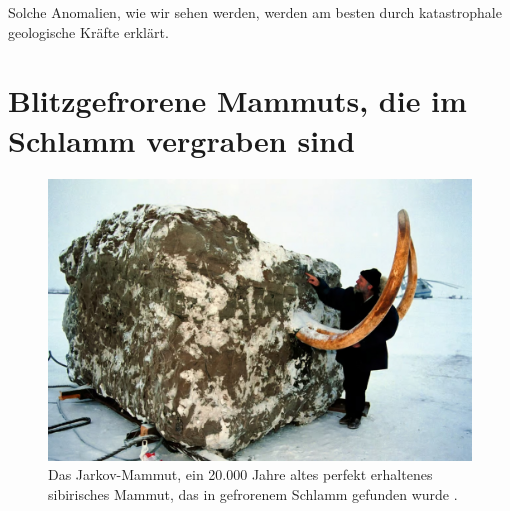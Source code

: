 \documentclass[10pt,twocolumn,letterpaper]{article}
\begin{document}
Solche Anomalien, wie wir sehen werden, werden am besten durch katastrophale geologische Kräfte erklärt.

\section{Blitzgefrorene Mammuts, die im Schlamm vergraben sind}

\begin{figure}[t]
\begin{center}
   \includegraphics[width=1\linewidth]{jarkov-mammoth.jpg}
\end{center}
   \caption{Das Jarkov-Mammut, ein 20.000 Jahre altes perfekt erhaltenes sibirisches Mammut, das in gefrorenem Schlamm gefunden wurde \cite{51}.}
\label{fig:1}
\label{fig:onecol}
\end{figure}
\end{document}
